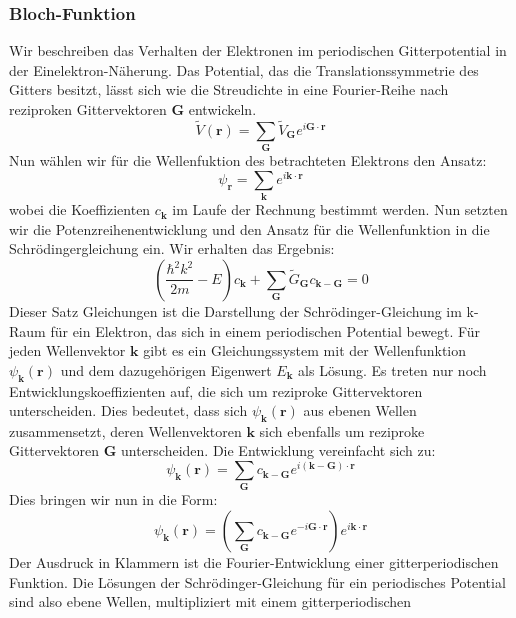 \documentclass[11pt]{article}
\begin{document}
\subsubsection{Bloch-Funktion}
Wir beschreiben das Verhalten der Elektronen im periodischen Gitterpotential in
der Einelektron-Näherung. Das Potential, das die Translationssymmetrie des
Gitters besitzt, lässt sich wie die Streudichte in eine Fourier-Reihe nach
reziproken Gittervektoren $\bm{G}$ entwickeln.
\begin{equation}
  \tilde{V}(\bm{r})=\sum_{\bm{G}}\tilde{V}_{\bm{G}}e^{i\bm{G}\cdot\bm{r}}
\end{equation}
Nun wählen wir für die Wellenfuktion des betrachteten Elektrons den Ansatz:
\begin{equation}
  \psi_{\bm{r}}=\sum_{\bm{k}}e^{i\bm{k}\cdot\bm{r}}
\end{equation}
wobei die Koeffizienten $c_{\bm{k}}$ im Laufe der Rechnung bestimmt werden.
Nun setzten wir die Potenzreihenentwicklung und den Ansatz für die
Wellenfunktion in die Schrödingergleichung ein. Wir erhalten das Ergebnis:
\begin{equation}
  \left(\frac{\hbar^2k^2}{2m}-E\right)c_{\bm{k}}+\sum_{\bm{G}}
  \tilde{G}_{\bm{G}}c_{\bm{k}-\bm{G}}=0
\end{equation}
Dieser Satz Gleichungen ist die Darstellung der Schrödinger-Gleichung im k-Raum
für ein Elektron, das sich in einem periodischen Potential bewegt. Für jeden
Wellenvektor $\bm{k}$ gibt es ein Gleichungssystem mit der Wellenfunktion
$\psi_{\bm{k}}(\bm{r})$ und dem dazugehörigen Eigenwert $E_{\bm{k}}$ als
Lösung. Es treten nur noch Entwicklungskoeffizienten auf, die sich um reziproke
Gittervektoren unterscheiden. Dies bedeutet, dass sich $\psi_{\bm{k}}(\bm{r})$
aus ebenen Wellen zusammensetzt, deren Wellenvektoren $\bm{k}$ sich ebenfalls
um reziproke Gittervektoren $\bm{G}$ unterscheiden. Die Entwicklung vereinfacht
sich zu:
\begin{equation}
  \psi_{\bm{k}}(\bm{r})=\sum_{\bm{G}}c_{\bm{k}-\bm{G}}
  e^{i(\bm{k}-\bm{G})\cdot\bm{r}}
\end{equation}
Dies bringen wir nun in die Form:
\begin{equation}
  \psi_{\bm{k}}(\bm{r})=\left(\sum_{\bm{G}}c_{\bm{k}-\bm{G}}
  e^{-i\bm{G}\cdot\bm{r}}\right)e^{i\bm{k}\cdot\bm{r}}
\end{equation}
Der Ausdruck in Klammern ist die Fourier-Entwicklung einer gitterperiodischen
Funktion. Die Lösungen der Schrödinger-Gleichung für ein periodisches Potential
sind also ebene Wellen, multipliziert mit einem gitterperiodischen
\end{document}
